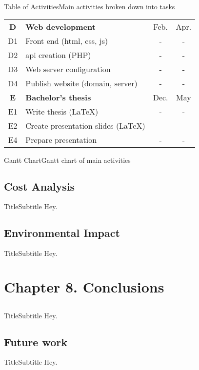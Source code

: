 \documentclass{beamer}
\begin{document}
\begin{frame}{Table of Activities}{Main activities broken down into tasks}
{\begin{tabular}{cp{}cc}
      \textbf{D} & \textbf{Web development}                    & Feb. & Apr. \\
      D1         & Front end (\acs{html}, \acs{css}, \acs{js}) & -    & -    \\
      D2         & \Acs{api} creation (PHP)                    & -    & -    \\
      D3         & Web server configuration                    & -    & -    \\
      D4         & Publish website (domain, server)            & -    & -    \\
      \midrule

      \rowcolor{rowColor}
      \textbf{E}             & \textbf{Bachelor's thesis}          & Dec. & May \\
      \rowcolor{rowColor}
      E1                     & Write thesis (\LaTeX)               & -    & -   \\
      \rowcolor{rowColor}
      E2                     & Create presentation slides (\LaTeX) & -    & -   \\
      \rowcolor{rowColor} E4 & Prepare presentation                & -    & -   \\
      \bottomrule
    \end{tabular}
  }
\end{frame}

\begin{frame}{Gantt Chart}{Gantt chart of main activities}
  \centering
  
\end{frame}


\subsection{Cost Analysis}

\begin{frame}{Title}{Subtitle}
  Hey.
\end{frame}


\subsection{Environmental Impact}

\begin{frame}{Title}{Subtitle}
  Hey.
\end{frame}



\section{Chapter 8. Conclusions}

\subsection*{}

\begin{frame}{Title}{Subtitle}
  Hey.
\end{frame}

\subsection{Future work}

\begin{frame}{Title}{Subtitle}
  Hey.
\end{frame}
\end{document}
